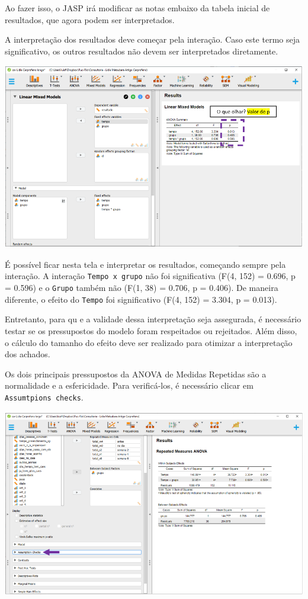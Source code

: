 \documentclass[
]{book}
\begin{document}
Ao fazer isso, o JASP irá modificar as notas embaixo da tabela inicial de resultados, que agora podem ser interpretados.

A interpretação dos resultados deve começar pela interação. Caso este termo seja significativo, os outros resultados não devem ser interpretados diretamente.

\includegraphics{./img/cap_lmm_resultados.png}

É possível ficar nesta tela e interpretar os resultados, começando sempre pela interação. A interação \texttt{Tempo\ x\ grupo} não foi significativa (F(4, 152) = 0.696, p = 0.596) e o \texttt{Grupo} também não (F(1, 38) = 0.706, p = 0.406). De maneira diferente, o efeito do \texttt{Tempo} foi significativo (F(4, 152) = 3.304, p = 0.013).

Entretanto, para qu e a validade dessa interpretação seja assegurada, é necessário testar se os pressupostos do modelo foram respeitados ou rejeitados. Além disso, o cálculo do tamanho do efeito deve ser realizado para otimizar a interpretação dos achados.

Os dois principais pressupostos da ANOVA de Medidas Repetidas são a normalidade e a esfericidade. Para verificá-los, é necessário clicar em \texttt{Assumtpions\ checks}.

\includegraphics{./img/cap_anovarm_pressupostos.png}
\end{document}
